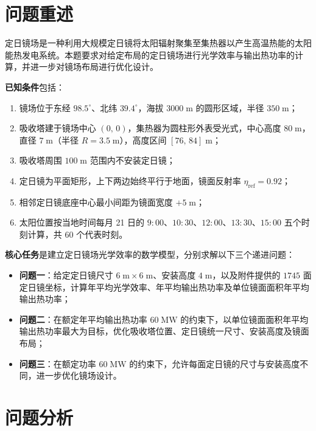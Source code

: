 \documentclass[12pt,a4paper,fontset=fandol]{ctexart}
\begin{document}
\section{问题重述}

定日镜场是一种利用大规模定日镜将太阳辐射聚集至集热器以产生高温热能的太阳能热发电系统。本题要求对给定布局的定日镜场进行光学效率与输出热功率的计算，并进一步对镜场布局进行优化设计。

\textbf{已知条件}包括：
\begin{enumerate}
    \item 镜场位于东经 $98.5^{\circ}$、北纬 $39.4^{\circ}$，海拔 $3000\;\mathrm{m}$ 的圆形区域，半径 $350\;\mathrm{m}$；
    \item 吸收塔建于镜场中心 $(0,\,0)$，集热器为圆柱形外表受光式，中心高度 $80\;\mathrm{m}$，直径 $7\;\mathrm{m}$（半径 $R=3.5\;\mathrm{m}$），高度区间 $[76,\,84]\;\mathrm{m}$；
    \item 吸收塔周围 $100\;\mathrm{m}$ 范围内不安装定日镜；
    \item 定日镜为平面矩形，上下两边始终平行于地面，镜面反射率 $\eta_{\mathrm{ref}} = 0.92$；
    \item 相邻定日镜底座中心最小间距为镜面宽度 $+ 5\;\mathrm{m}$；
    \item 太阳位置按当地时间每月 21 日的 $9{:}00$、$10{:}30$、$12{:}00$、$13{:}30$、$15{:}00$ 五个时刻计算，共 $60$ 个代表时刻。
\end{enumerate}

\textbf{核心任务}是建立定日镜场光学效率的数学模型，分别求解以下三个递进问题：
\begin{itemize}
    \item \textbf{问题一}：给定定日镜尺寸 $6\;\mathrm{m} \times 6\;\mathrm{m}$、安装高度 $4\;\mathrm{m}$，以及附件提供的 $1745$ 面定日镜坐标，计算年平均光学效率、年平均输出热功率及单位镜面面积年平均输出热功率；
    \item \textbf{问题二}：在额定年平均输出热功率 $60\;\mathrm{MW}$ 的约束下，以单位镜面面积年平均输出热功率最大为目标，优化吸收塔位置、定日镜统一尺寸、安装高度及镜面布局；
    \item \textbf{问题三}：在额定功率 $60\;\mathrm{MW}$ 的约束下，允许每面定日镜的尺寸与安装高度不同，进一步优化镜场设计。
\end{itemize}

\section{问题分析}
\end{document}
